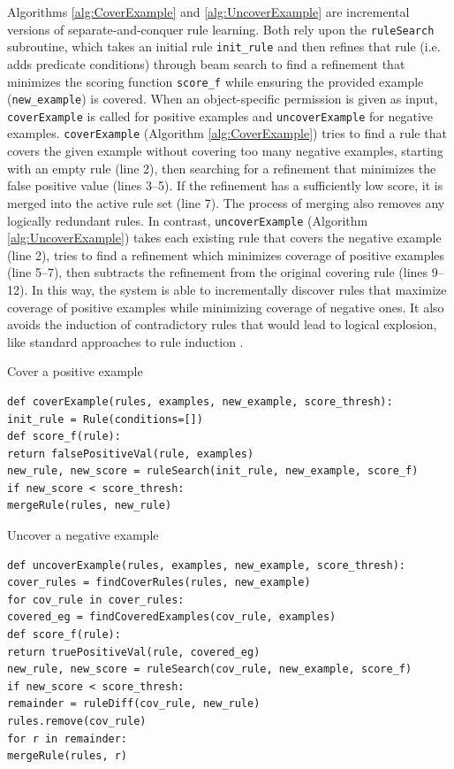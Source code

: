 \documentclass[letterpaper]{article} %
\begin{document}
Algorithms \ref{alg:CoverExample} and \ref{alg:UncoverExample} are incremental versions of separate-and-conquer rule learning. Both rely upon the \texttt{\small{ruleSearch}} subroutine, which takes an initial rule \texttt{\small{init\_rule}} and then refines that rule (i.e. adds predicate conditions) through beam search to find a refinement that minimizes the scoring function \texttt{\small{score\_f}} while ensuring the provided example (\texttt{\small{new\_example}}) is covered. When an object-specific permission is given as input, \texttt{\small{coverExample}} is called for positive examples and \texttt{\small{uncoverExample}} for negative examples. \texttt{\small{coverExample}} (Algorithm \ref{alg:CoverExample}) tries to find a rule that covers the given example without covering too many negative examples, starting with an empty rule (line 2), then searching for a refinement that minimizes the false positive value (lines 3--5). If the refinement has a sufficiently low score, it is merged into the active rule set (line 7). The process of merging also removes any logically redundant rules. In contrast, \texttt{\small{uncoverExample}} (Algorithm \ref{alg:UncoverExample}) takes each existing rule that covers the negative example (line 2), tries to find a refinement which minimizes coverage of positive examples (line 5--7), then subtracts the refinement from the original covering rule (lines 9--12). In this way, the system is able to incrementally discover rules that maximize coverage of positive examples while minimizing coverage of negative ones. It also avoids the induction of contradictory rules that would lead to logical explosion, like standard approaches to rule induction \cite{furnkranz1999separate}.

\lstset{language=Python}

\begin{algorithm}[p]
\caption{Cover a positive example}
\label{alg:CoverExample}
\begin{lstlisting}
def coverExample(rules, examples, new_example, score_thresh):
init_rule = Rule(conditions=[])
def score_f(rule):
return falsePositiveVal(rule, examples)
new_rule, new_score = ruleSearch(init_rule, new_example, score_f)
if new_score < score_thresh:
mergeRule(rules, new_rule)
\end{lstlisting}
\end{algorithm}

\begin{algorithm}[p]
\caption{Uncover a negative example}
\label{alg:UncoverExample}
\begin{lstlisting}
def uncoverExample(rules, examples, new_example, score_thresh):
cover_rules = findCoverRules(rules, new_example)
for cov_rule in cover_rules:
covered_eg = findCoveredExamples(cov_rule, examples)
def score_f(rule):
return truePositiveVal(rule, covered_eg)
new_rule, new_score = ruleSearch(cov_rule, new_example, score_f)
if new_score < score_thresh:
remainder = ruleDiff(cov_rule, new_rule)
rules.remove(cov_rule)
for r in remainder:
mergeRule(rules, r)
\end{lstlisting}
\end{algorithm}
\end{document}

